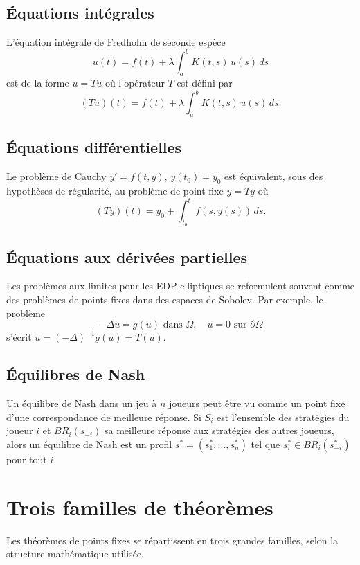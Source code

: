 \subsection{\'Equations int\'egrales}

L'\'equation int\'egrale de Fredholm de seconde esp\`ece
\[
    u(t) = f(t) + \lambda \int_a^b K(t,s) \, u(s) \, ds
\]
est de la forme $u = Tu$ o\`u l'op\'erateur $T$ est d\'efini par
\[
    (Tu)(t) = f(t) + \lambda \int_a^b K(t,s) \, u(s) \, ds.
\]

\subsection{\'Equations diff\'erentielles}

Le probl\`eme de Cauchy $y' = f(t,y)$, $y(t_0) = y_0$ est \'equivalent, sous
des hypoth\`eses de r\'egularit\'e, au probl\`eme de point fixe $y = Ty$ o\`u
\[
    (Ty)(t) = y_0 + \int_{t_0}^t f(s, y(s)) \, ds.
\]

\subsection{\'Equations aux d\'eriv\'ees partielles}

Les probl\`emes aux limites pour les EDP elliptiques se reformulent souvent
comme des probl\`emes de points fixes dans des espaces de Sobolev. Par exemple,
le probl\`eme
\[
    -\Delta u = g(u) \text{ dans } \Omega, \quad u = 0 \text{ sur } \partial\Omega
\]
s'\'ecrit $u = (-\Delta)^{-1} g(u) = T(u)$.

\subsection{\'Equilibres de Nash}

Un \'equilibre de Nash dans un jeu \`a $n$ joueurs peut \^etre vu comme un point
fixe d'une correspondance de meilleure r\'eponse. Si $S_i$ est l'ensemble des
strat\'egies du joueur $i$ et $BR_i(s_{-i})$ sa meilleure r\'eponse aux strat\'egies
des autres joueurs, alors un \'equilibre de Nash est un profil $s^* = (s_1^*, \ldots, s_n^*)$
tel que $s_i^* \in BR_i(s_{-i}^*)$ pour tout $i$.

\section{Trois familles de th\'eor\`emes}

Les th\'eor\`emes de points fixes se r\'epartissent en trois grandes familles,
selon la structure math\'ematique utilis\'ee.

